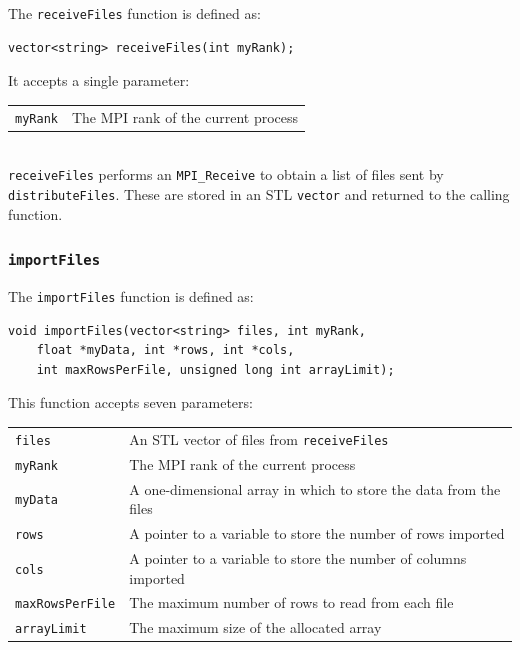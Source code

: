 \documentclass{article}
\begin{document}
The \texttt{receiveFiles} function is defined as:

\lstset{language=C++, keepspaces=true}
\begin{lstlisting}
vector<string> receiveFiles(int myRank);
\end{lstlisting}

It accepts a single parameter: \\

\begin{tabular}{l l}
\texttt{myRank} & The MPI rank of the current process \\
\end{tabular} \\

\texttt{receiveFiles} performs an \texttt{MPI\_Receive} to obtain a list of files sent by \texttt{distributeFiles}. These are stored in an STL \texttt{vector} and returned to the calling function.


%
%

\subsubsection{\texttt{importFiles}}\label{sec:importFiles}


The \texttt{importFiles} function is defined as:

\begin{minipage}{\linewidth}
\lstset{language=C++, keepspaces=true}
\begin{lstlisting}
void importFiles(vector<string> files, int myRank,
	float *myData, int *rows, int *cols, 
	int maxRowsPerFile, unsigned long int arrayLimit);
\end{lstlisting}
\end{minipage}

This function accepts seven parameters: \\

\begin{tabular}{l l}
\texttt{\texttt{files}}          & An STL vector of files from \texttt{receiveFiles} \\
\texttt{\texttt{myRank}}         & The MPI rank of the current process \\
\texttt{\texttt{myData}}         & A one-dimensional array in which to store the data from the files \\
\texttt{\texttt{rows}}           & A pointer to a variable to store the number of rows imported \\
\texttt{\texttt{cols}}           & A pointer to a variable to store the number of columns imported  \\
\texttt{\texttt{maxRowsPerFile}} & The maximum number of rows to read from each file \\
\texttt{\texttt{arrayLimit}}     & The maximum size of the allocated array \\
\end{tabular} \\
\end{document}
